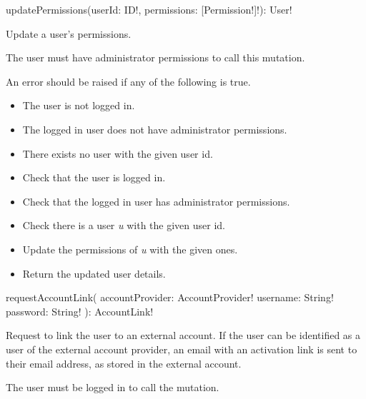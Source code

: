 
\begin{code}
updatePermissions(userId: ID!, permissions: [Permission!]!): User!
\end{code}

Update a user's permissions.

\restrictions

The user must have administrator permissions to call this mutation.

\errors

An error should be raised if any of the following is true.

\begin{itemize}
    \item The user is not logged in.
    \item The logged in user does not have administrator permissions.
    \item There exists no user with the given user id.
\end{itemize}

\functionality

\begin{itemize}
    \item Check that the user is logged in.
    \item Check that the logged in user has administrator permissions.
    \item Check there is a user \emph{u} with the given user id.
    \item Update the permissions of \emph{u} with the given ones.
    \item Return the updated user details.
\end{itemize}


\begin{code}
requestAccountLink(
  accountProvider: AccountProvider!
  username: String!
  password: String!
): AccountLink!
\end{code}

Request to link the user to an external account. If the user can be identified as a user of the external account provider, an email with an activation link is sent to their email address, as stored in the external account.

\restrictions

The user must be logged in to call the mutation.

\errors

